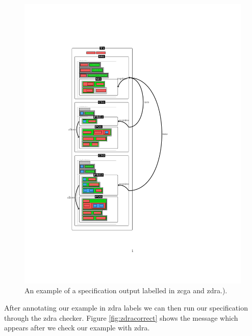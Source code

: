 \begin{figure}[H]
\begin{minipage}{0.45\textwidth}
\begin{tiny}
\begin{BVerbatim}[commandchars=+\[\]]
\end{BVerbatim}
\end{tiny}
\includegraphics[scale=1, clip, trim=2cm 3cm 2cm 3cm, width=1.00\textwidth]{Figures/fullexample/1n2.pdf}
\caption{An example of a specification output labelled in \gls{zcga} and \gls{zdra}.).\label{fig:zdrazcgaout}}
\end{minipage}
\end{figure}

After annotating our example in \gls{zdra} labels we can then run our
specification through the \gls{zdra} checker. Figure \ref{fig:zdracorrect} shows
the message which appears after we check our example with \gls{zdra}.


